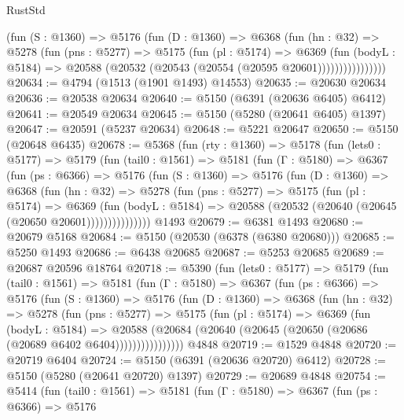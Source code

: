 \begin{lexlean}{RustStd}
\begin{coremodule}
                (fun (S : @1360) =>
                @5176
                  (fun (D : @1360) =>
                  @6368
                    (fun (hn : @32) =>
                    @5278
                      (fun (pns : @5277) =>
                      @5175
                        (fun (pl : @5174) =>
                        @6369
                          (fun (bodyL : @5184) =>
                          @20588 (@20532 (@20543 (@20554 (@20595 @20601))))))))))))))))
@20634 := @4794 (@1513 (@1901 @1493) @14553)
@20635 := @20630 @20634
@20636 := @20538 @20634
@20640 := @5150 (@6391 (@20636 @6405) @6412)
@20641 := @20549 @20634
@20645 := @5150 (@5280 (@20641 @6405) @1397)
@20647 := @20591 (@5237 @20634)
@20648 := @5221 @20647
@20650 := @5150 (@20648 @6435)
@20678 := @5368
    (fun (rty : @1360) =>
    @5178
      (fun (lets0 : @5177) =>
      @5179
        (fun (tail0 : @1561) =>
        @5181
          (fun (Γ : @5180) =>
          @6367
            (fun (ps : @6366) =>
            @5176
              (fun (S : @1360) =>
              @5176
                (fun (D : @1360) =>
                @6368
                  (fun (hn : @32) =>
                  @5278
                    (fun (pns : @5277) =>
                    @5175
                      (fun (pl : @5174) =>
                      @6369
                        (fun (bodyL : @5184) =>
                        @20588 (@20532 (@20640 (@20645 (@20650 @20601)))))))))))))))
    @1493
@20679 := @6381 @1493
@20680 := @20679 @5168
@20684 := @5150 (@20530 (@6378 (@6380 @20680)))
@20685 := @5250 @1493
@20686 := @6438 @20685
@20687 := @5253 @20685
@20689 := @20687 @20596 @18764
@20718 := @5390
    (fun (lets0 : @5177) =>
    @5179
      (fun (tail0 : @1561) =>
      @5181
        (fun (Γ : @5180) =>
        @6367
          (fun (ps : @6366) =>
          @5176
            (fun (S : @1360) =>
            @5176
              (fun (D : @1360) =>
              @6368
                (fun (hn : @32) =>
                @5278
                  (fun (pns : @5277) =>
                  @5175
                    (fun (pl : @5174) =>
                    @6369
                      (fun (bodyL : @5184) =>
                      @20588
                        (@20684 (@20640 (@20645 (@20650 (@20686 (@20689 @6402 @6404))))))))))))))))
    @4848
@20719 := @1529 @4848
@20720 := @20719 @6404
@20724 := @5150 (@6391 (@20636 @20720) @6412)
@20728 := @5150 (@5280 (@20641 @20720) @1397)
@20729 := @20689 @4848
@20754 := @5414
    (fun (tail0 : @1561) =>
    @5181
      (fun (Γ : @5180) =>
      @6367
        (fun (ps : @6366) =>
        @5176

\end{coremodule}
\end{lexlean}
